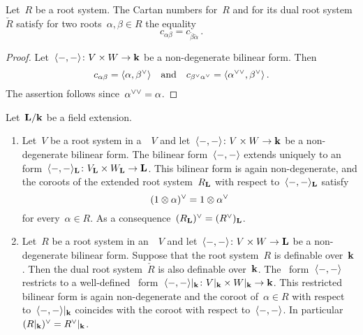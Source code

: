 \begin{corollary}
  Let~$R$ be a root system.
  The Cartan numbers for~$R$ and for its dual root system~$\check{R}$ satisfy for two roots~$\alpha, \beta \in R$ the equality
  \[
    c_{\alpha \beta}
    =
    c_{\check{\beta} \check{\alpha}} \,.
  \]
\end{corollary}


\begin{proof}
  Let~$\langle-,-\rangle \colon V \times W \to \mathbf{k}$ be a non-degenerate bilinear form.
  Then
  \[
    c_{\alpha \beta}
    =
    \pair{\alpha, \check{\beta}}
    \quad\text{and}\quad
    c_{\check{\beta} \check{\alpha}}
    =
    \pair{\dcheck{\alpha}, \check{\beta}} \,.
  \]
  The assertion follows since~$\dcheck{\alpha} = \alpha$.
\end{proof}




\begin{proposition}
  Let~$\mathbf{L}/\mathbf{k}$ be a field extension.
  \begin{enumerate}
    \item
      Let~$V$ be a root system in a~{\vectorspace{$\kf$}}~$V$ and let~$\langle-,-\rangle \colon V \times W \to \mathbf{k}$ be a non-degenerate bilinear form.
      The bilinear form~$\langle-,-\rangle$ extends uniquely to an~{\bilinear{$\Lf$}} form~$\langle-,-\rangle_{\mathbf{L}} \colon V_{\mathbf{L}} \times W_{\mathbf{L}} \to \mathbf{L}$.
      This bilinear form is again non-degenerate, and the coroots of the extended root system~$R_{\mathbf{L}}$ with respect to~$\langle-,-\rangle_{\mathbf{L}}$ satisfy
      \[
        \check{(1 \tensor \alpha)}
        =
        1 \tensor \check{\alpha}
      \]
      for every~$\alpha \in R$.
      As a consequence~$\check{(R_{\Lf})} = (\check{R})_{\Lf}$.
    \item
      Let~$R$ be a root system in an~{\vectorspace{$\Lf$}}~$V$ and let~$\langle-,-\rangle \colon V \times W \to \mathbf{L}$ be a non-degenerate bilinear form.
      Suppose that the root system~$R$ is definable over~$\kf$.
      Then the dual root system~$\check{R}$ is also definable over~$\kf$.
      The~{\bilinear{$\Lf$}} form~$\langle-,-\rangle$ restricts to a well-defined~{\bilinear{$\kf$}} form~$\restrict{\pair{-,-}}{\kf} \colon \restrict{V}{\kf} \times \restrict{W}{\kf} \to \kf$.
      This restricted bilinear form is again non-degenerate and the coroot of~$\alpha \in R$ with respect to~$\restrict{\pair{-,-}}{\kf}$ coincides with the coroot with respect to~$\langle-,-\rangle$.
      In particular~$\check{(\restrict{R}{\kf})} = \restrict{\check{R}}{\kf}$.
  \end{enumerate}
\end{proposition}





